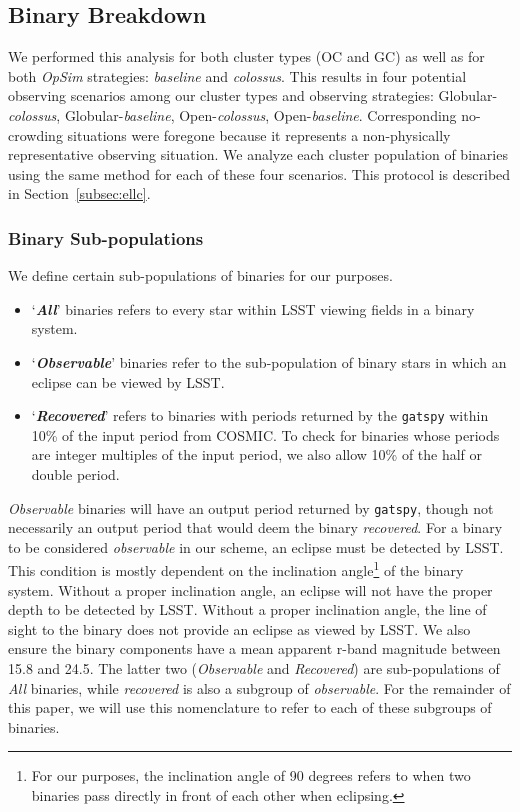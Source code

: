 \documentclass[twocolumn]{aastex63}
\begin{document}
\subsection{Binary Breakdown}
\label{subsec: BinaryBreakdown}
We performed this analysis for both cluster types (OC and GC) as well as for both \textit{OpSim} strategies: \textit{baseline} and \textit{colossus}. %
This results in four potential observing scenarios among our cluster types and observing strategies: Globular-\textit{colossus}, Globular-\textit{baseline}, Open-\textit{colossus}, Open-\textit{baseline}. Corresponding no-crowding situations were foregone because it represents a non-physically representative observing situation. We analyze each cluster population of binaries using the same method for each of these four scenarios. This protocol is described in Section~\ref{subsec:ellc}.

\subsubsection{Binary Sub-populations}
We define certain sub-populations of binaries for our purposes.

\begin{itemize}
    \item ‘\textbf{\textit{All}}’ binaries refers to every star  within LSST viewing fields in a binary system.
    \item ‘\textbf{\textit{Observable}}’ binaries refer to the sub-population of binary stars in which an eclipse can be viewed by LSST. 
    \item ‘\textbf{\textit{Recovered}}’ refers to binaries with periods returned by the \texttt{gatspy} within 10\% of the input period from COSMIC. To check for binaries whose periods are integer multiples of the input period, we also allow 10\% of the half or double period. 
\end{itemize}

\textit{Observable} binaries will have an output period returned by \texttt{gatspy}, though not necessarily an output period that would deem the binary \textit{recovered}. For a binary to be considered \textit{observable} in our scheme, an eclipse must be detected by LSST. This condition is mostly dependent on the inclination angle\footnote{For our purposes, the inclination angle of 90 degrees refers to when two binaries pass directly in front of each other when eclipsing.} of the binary system. Without a proper inclination angle, an eclipse will not have the proper depth to be detected by LSST.
Without a proper inclination angle, the line of sight to the binary does not provide an eclipse as viewed by LSST. We also ensure the binary components have a mean apparent r-band magnitude between 15.8 and 24.5. The latter two (\textit{Observable} and \textit{Recovered}) are sub-populations of \textit{All} binaries, while \textit{recovered} is also a subgroup of \textit{observable}. For the remainder of this paper, we will use this nomenclature to refer to each of these subgroups of binaries.
\end{document}
